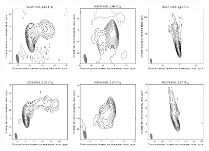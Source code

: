 \addtocounter{figure}{-1}
\begin{figure}
  \centering

  \includegraphics[width=0.3\textwidth]{0202+319_L.pdf}
  \includegraphics[width=0.3\textwidth]{0204+316_L.pdf}
  \includegraphics[width=0.3\textwidth]{0217+324_L.pdf}


  \includegraphics[width=0.3\textwidth]{0202+319_S.pdf}
  \includegraphics[width=0.3\textwidth]{0204+316_S.pdf}
  \includegraphics[width=0.3\textwidth]{0217+324_S.pdf}



\end{figure}
